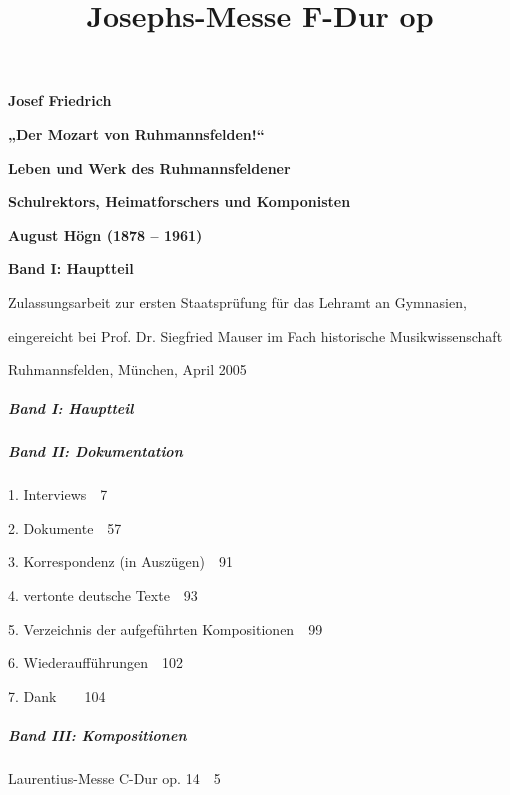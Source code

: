 \documentclass[a4paper]{article}
\title{Josephs-Messe F-Dur op}
\begin{document}
\clearpage{}
{\centering\bfseries
Josef Friedrich
\par}

{\centering
\textbf{„Der Mozart von Ruhmannsfelden!“}
\par}

{\centering\bfseries
\textmd{Leben und Werk des Ruhmannsfeldener }
\par}

{\centering\bfseries
\textmd{Schulrektors, Heimatforschers und Komponisten }
\par}

{\centering\bfseries
\textmd{August Högn (1878 – 1961)}
\par}

{%
 \par}
{\centering\bfseries
Band I: Hauptteil
\par}

{\centering
Zulassungsarbeit zur ersten Staatsprüfung für das Lehramt an Gymnasien,
\par}

{\centering
eingereicht bei Prof. Dr. Siegfried Mauser im Fach historische
Musikwissenschaft
\par}

{\centering
Ruhmannsfelden, München, April 2005
\par}


\subparagraph[Band I: Hauptteil]{Band I: Hauptteil}
\setcounter{tocdepth}{4}
\renewcommand\contentsname{}
\tableofcontents
\clearpage\subparagraph{Band II: Dokumentation}
1. Interviews\ \ 7

2. Dokumente\ \ 57

3. Korrespondenz (in Auszügen)\ \ 91

4. vertonte deutsche Texte\ \ 93

5. Verzeichnis der aufgeführten Kompositionen\ \ 99

6. Wiederaufführungen\ \ 102

7. Dank\ \ \ \ 104

\subparagraph{Band III: Kompositionen}
{\textquotedbl}Laurentius{\textquotedbl}-Messe C-Dur op. 14\ \ 5
\end{document}
